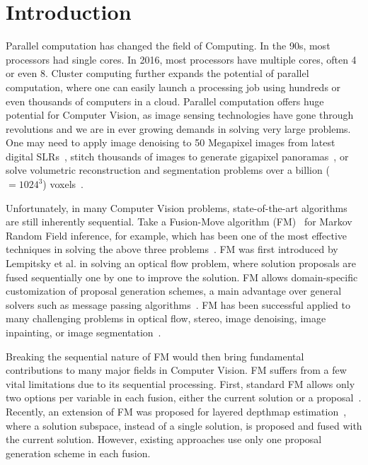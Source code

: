 \section{Introduction}
Parallel computation has changed the field of Computing.  In the 90s,
most processors had single cores. In 2016, most processors have multiple
cores, often 4 or even 8. Cluster computing further expands the
potential of parallel computation, where one can easily launch a
processing job using hundreds or even thousands of computers in a
cloud.
%
Parallel computation offers huge potential for Computer Vision, as
image sensing technologies have gone through revolutions and we are in
ever growing demands in solving very large problems. One may need to
apply image denoising to 50 Megapixel images from latest digital
SLRs~\cite{canon?}, stitch thousands of images to generate gigapixel
panoramas~\cite{gigapan}, or solve volumetric reconstruction and
segmentation problems over a billion ($=1024^3$)
voxels~\cite{Joint_3D_Scene_Reconstruction_and_class_Segmentation}.


Unfortunately, in many Computer Vision problems, state-of-the-art
algorithms are still inherently sequential. Take a Fusion-Move algorithm
(FM)~\cite{viktor,second_order_stereo,else} for Markov Random Field
inference, for example, which has been one of the most effective
techniques in solving the above three
problems~\cite{fusion_moves_for_markov_random_field_optimization}.
%
FM was first introduced by Lempitsky et al. in solving an optical flow
problem, where solution proposals are fused sequentially one by one to
improve the solution. FM allows domain-specific customization of
proposal generation schemes, a main advantage over general solvers such
as message passing algorithms~\cite{TRW,loopy_belief_propagation}. FM
has been successful applied to many challenging problems in optical
flow, stereo, image denoising, image inpainting, or image
segmentation~\cite{fusion_moves_for_markov_random_field_optimization}.


Breaking the sequential nature of FM would then bring fundamental
contributions to many major fields in Computer Vision. FM suffers from a
few vital limitations due to its sequential processing. First, standard
FM allows only two options per variable in each fusion, either the
current solution or a
proposal~\cite{fusion_moves_for_markov_random_field_optimization}.
Recently, an extension of FM was proposed for layered depthmap
estimation~\cite{chen_2016}, where a solution subspace, instead of a
single solution, is proposed and fused with the current
solution. However, existing approaches use only one proposal generation
scheme in each fusion.


